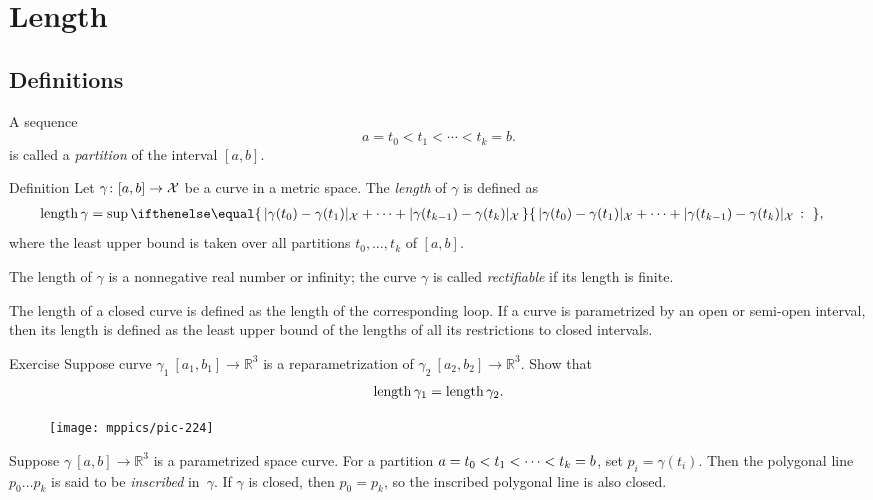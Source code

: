 \chapter{Length}
\label{chap:length}

\section{Definitions}

A sequence 
\[a=t_0 < t_1 < \cdots < t_k=b.\]
is called a \emph{partition} of the interval $[a,b]$.

\begin{thm}{Definition}\label{def:length}
Let $\gamma\colon[a,b]\to \mathcal{X}$ be a curve in a metric space.
The \emph{length} of $\gamma$ is defined as
\begin{align*}
\length \gamma
&= 
\sup
\set{\dist{\gamma(t_0)}{\gamma(t_1)}{\spc{X}}
+\dots+
\dist{\gamma(t_{k-1})}{\gamma(t_k)}{\spc{X}}}{},
\end{align*}
where the least upper bound is taken over all partitions $t_0,\dots,t_k$ of $[a,b]$.

The length of $\gamma$ is a nonnegative real number or infinity;
the curve $\gamma$ is called \emph{rectifiable} if its length is finite. 

The length of a closed curve is defined as the length of the corresponding loop.
If a curve is parametrized by an open or semi-open interval, then its length is defined as the least upper bound of the lengths of all its restrictions to closed intervals.
\end{thm}


\begin{thm}{Exercise}\label{ex:integral-length-0}
Suppose curve $\gamma_1\:[a_1,b_1] \to\mathbb{R}^3$ is a reparametrization of $\gamma_2\:[a_2,b_2] \to\mathbb{R}^3$. 
Show that
\[\mathop{\rm length}\nolimits \gamma_1 = \mathop{\rm length}\nolimits \gamma_2.\]

\end{thm}

\begin{wrapfigure}[4]{r}{33 mm}
\vskip-4mm
\centering
\texttt{[image: mppics/pic-224]}
\end{wrapfigure}

Suppose $\gamma\:[a,b]\to \mathbb{R}^3$ is a parametrized space curve.
For a partition $a=t_0 < t_1 < \z\cdots < t_k=b$, set $p_i=\gamma(t_i)$.
Then the polygonal line $p_0\dots p_k$ is said to be \emph{inscribed} in~$\gamma$.
If $\gamma$ is closed, then $p_0=p_k$, so the inscribed polygonal line is also closed.

